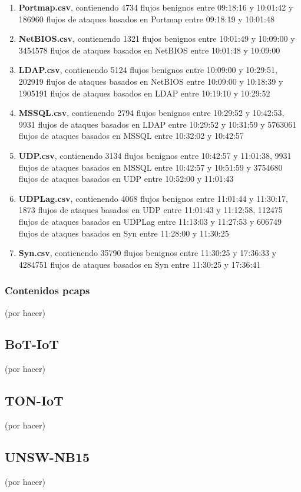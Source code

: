 \begin{enumerate}
    \item \textbf{Portmap.csv}, contienendo 4734 flujos benignos entre 09:18:16 y 10:01:42 y 186960 flujos de ataques basados en Portmap entre 09:18:19 y 10:01:48
    \item \textbf{NetBIOS.csv}, contienendo 1321 flujos benignos entre 10:01:49 y 10:09:00 y 3454578 flujos de ataques basados en NetBIOS entre 10:01:48 y 10:09:00
    \item \textbf{LDAP.csv}, contienendo 5124 flujos benignos entre 10:09:00 y 10:29:51, 202919 flujos de ataques basados en NetBIOS entre 10:09:00 y 10:18:39 y 1905191 flujos de ataques basados en LDAP entre 10:19:10 y 10:29:52
    \item \textbf{MSSQL.csv}, contienendo 2794 flujos benignos entre 10:29:52 y 10:42:53, 9931 flujos de ataques basados en LDAP entre 10:29:52 y 10:31:59 y 5763061 flujos de ataques basados en MSSQL entre 10:32:02 y 10:42:57
    \item \textbf{UDP.csv}, contienendo 3134 flujos benignos entre 10:42:57 y 11:01:38, 9931 flujos de ataques basados en MSSQL entre 10:42:57 y 10:51:59 y 3754680 flujos de ataques basados en UDP entre 10:52:00 y 11:01:43
    \item \textbf{UDPLag.csv}, contienendo 4068 flujos benignos entre 11:01:44 y 11:30:17, 1873 flujos de ataques basados en UDP entre 11:01:43 y 11:12:58, 112475 flujos de ataques basados en UDPLag entre 11:13:03 y 11:27:53 y 606749 flujos de ataques basados en Syn entre 11:28:00 y 11:30:25
    \item \textbf{Syn.csv}, contienendo 35790 flujos benignos entre 11:30:25 y 17:36:33 y 4284751 flujos de ataques basados en Syn entre 11:30:25 y 17:36:41
\end{enumerate}


\subsubsection{Contenidos pcaps}

(por hacer)

\subsection{BoT-IoT}

(por hacer)

\subsection{TON-IoT}

(por hacer)

\subsection{UNSW-NB15}

(por hacer)
